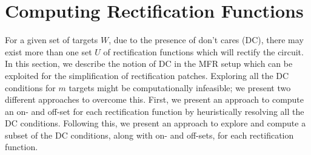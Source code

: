 \section{Computing Rectification Functions}\label{sec:rfunc}


For a given set of targets $W$, due 
to the presence of don't cares (DC), there may exist more 
than one set $U$ of rectification functions which will rectify the circuit.
In this section, we describe the notion of DC 
in the MFR setup which can be exploited for the simplification
of rectification patches.
Exploring all the DC conditions for $m$ targets might be computationally infeasible; we
present two different approaches to overcome this. First,
we present an approach to compute an on- and off-set for each rectification function by 
heuristically resolving all the DC conditions.
Following this, we present an approach to 
explore and compute a subset of the DC conditions, along with 
on- and off-sets, for each rectification function.




